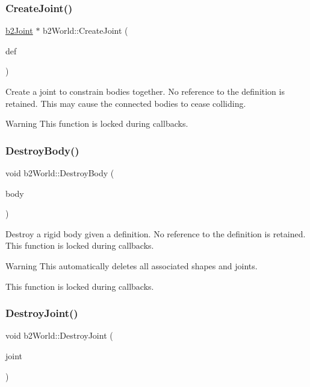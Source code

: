 \subsubsection{\texorpdfstring{Create\+Joint()}{CreateJoint()}}
{\footnotesize\ttfamily \hyperlink{classb2_joint}{b2\+Joint} $\ast$ b2\+World\+::\+Create\+Joint (\begin{DoxyParamCaption}\item[{const \hyperlink{structb2_joint_def}{b2\+Joint\+Def} $\ast$}]{def }\end{DoxyParamCaption})}

Create a joint to constrain bodies together. No reference to the definition is retained. This may cause the connected bodies to cease colliding. \begin{DoxyWarning}{Warning}
This function is locked during callbacks. 
\end{DoxyWarning}
\mbox{\label{classb2_world_ad52231ad7a9556ef5735ac79cbcd8fcf}} 
\subsubsection{\texorpdfstring{Destroy\+Body()}{DestroyBody()}}
{\footnotesize\ttfamily void b2\+World\+::\+Destroy\+Body (\begin{DoxyParamCaption}\item[{\hyperlink{classb2_body}{b2\+Body} $\ast$}]{body }\end{DoxyParamCaption})}

Destroy a rigid body given a definition. No reference to the definition is retained. This function is locked during callbacks. \begin{DoxyWarning}{Warning}
This automatically deletes all associated shapes and joints. 

This function is locked during callbacks. 
\end{DoxyWarning}
\mbox{\label{classb2_world_add5942aef171e54cfa384c8975746dca}} 
\subsubsection{\texorpdfstring{Destroy\+Joint()}{DestroyJoint()}}
{\footnotesize\ttfamily void b2\+World\+::\+Destroy\+Joint (\begin{DoxyParamCaption}\item[{\hyperlink{classb2_joint}{b2\+Joint} $\ast$}]{joint }\end{DoxyParamCaption})}

